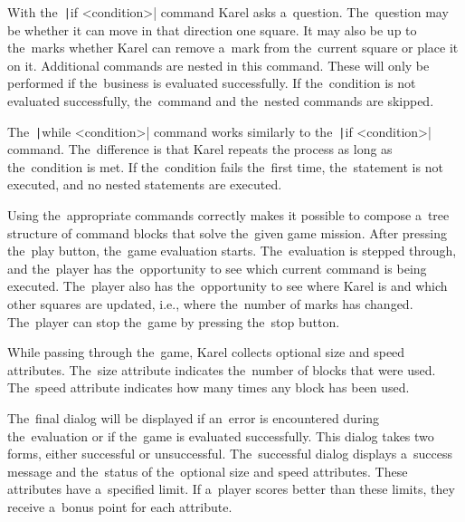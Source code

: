 With the~\texttt|if <condition>| command Karel asks a~question.
The~question may be whether it can move in that direction one square.
It may also be up to the~marks whether Karel can remove a~mark from the~current square or place it on it.
Additional commands are nested in this command.
These will only be performed if the~business is evaluated successfully.
If the~condition is not evaluated successfully, the~command and the~nested commands are skipped.

The~\texttt|while <condition>| command works similarly to the~\texttt|if <condition>| command.
The~difference is that Karel repeats the process as long as the~condition is met.
If the~condition fails the~first time, the~statement is not executed, and no nested statements are executed.

Using the~appropriate commands correctly makes it possible to compose a~tree structure of command blocks that solve the~given game mission.
After pressing the~play button, the~game evaluation starts.
The~evaluation is stepped through, and the~player has the~opportunity to see which current command is being executed.
The~player also has the~opportunity to see where Karel is and which other squares are updated, i.e., where the~number of marks has changed.
The~player can stop the~game by pressing the~stop button. 

While passing through the~game, Karel collects optional size and speed attributes.
The~size attribute indicates the~number of blocks that were used.
The~speed attribute indicates how many times any block has been used.

The~final dialog will be displayed if an~error is encountered during the~evaluation or if the~game is evaluated successfully.
This dialog takes two forms, either successful or unsuccessful.
The~successful dialog displays a~success message and the~status of the~optional size and speed attributes.
These attributes have a~specified limit.
If a~player scores better than these limits, they receive a~bonus point for each attribute.
